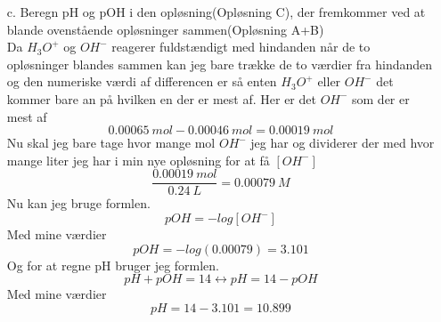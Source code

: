 \documentclass[12pt]{article}
\begin{document}
\begin{itemize}
  \item[c.] Beregn pH og pOH i den opløsning(Opløsning C), der fremkommer ved at blande ovenstående opløsninger sammen(Opløsning A+B)\\
  Da $H_3O^+$ og $OH^{-}$ reagerer fuldstændigt med hindanden når de to opløsninger blandes sammen kan jeg bare trække de to værdier fra hindanden og den numeriske værdi af differencen er
  så enten $H_3O^+$ eller $OH^{-}$ det kommer bare an på hvilken en der er mest af. Her er det $OH^{-}$ som der er mest af
  $$0.00065 \ mol-0.00046 \ mol=0.00019 \ mol$$
  Nu skal jeg bare tage hvor mange mol $OH^{-}$ jeg har og dividerer der med hvor mange liter jeg har i min nye opløsning for at få $[OH^{-}]$
  $$\frac{0.00019 \ mol}{0.24 \ L}=0.00079 \ M$$
  Nu kan jeg bruge formlen.
  $$pOH=-log[OH^{-}]$$
  Med mine værdier
  $$pOH=-log(0.00079)=3.101$$
  Og for at regne pH bruger jeg formlen.
  $$pH+pOH=14 \leftrightarrow pH=14-pOH$$
  Med mine værdier
  $$pH=14-3.101=10.899$$
\end{itemize}
\end{document}
